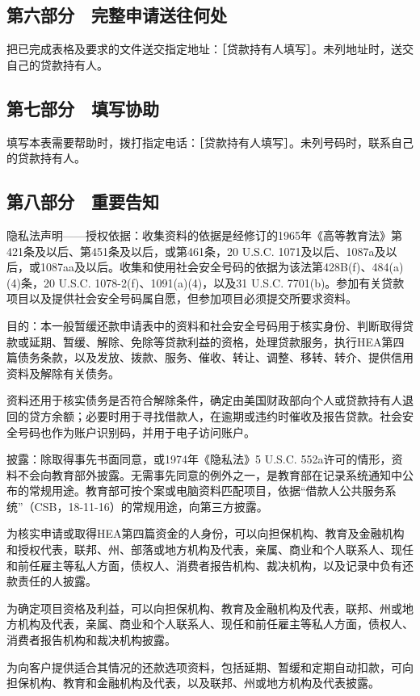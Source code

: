 \documentclass[UTF8,fontset=none,11pt,a4paper]{ctexart}
\begin{document}
\subsection*{第六部分　完整申请送往何处}
把已完成表格及要求的文件送交指定地址：［贷款持有人填写］。未列地址时，送交自己的贷款持有人。


\subsection*{第七部分　填写协助}
填写本表需要帮助时，拨打指定电话：［贷款持有人填写］。未列号码时，联系自己的贷款持有人。


\subsection*{第八部分　重要告知}
隐私法声明——授权依据：收集资料的依据是经修订的1965年《高等教育法》第421条及以后、第451条及以后，或第461条，20 U.S.C. 1071及以后、1087a及以后，或1087aa及以后。收集和使用社会安全号码的依据为该法第428B(f)、484(a)(4)条，20 U.S.C. 1078-2(f)、1091(a)(4)，以及31 U.S.C. 7701(b)。参加有关贷款项目以及提供社会安全号码属自愿，但参加项目必须提交所要求资料。


目的：本一般暂缓还款申请表中的资料和社会安全号码用于核实身份、判断取得贷款或延期、暂缓、解除、免除等贷款利益的资格，处理贷款服务，执行HEA第四篇债务条款，以及发放、拨款、服务、催收、转让、调整、移转、转介、提供信用资料及解除有关债务。


资料还用于核实债务是否符合解除条件，确定由美国财政部向个人或贷款持有人退回的贷方余额；必要时用于寻找借款人，在逾期或违约时催收及报告贷款。社会安全号码也作为账户识别码，并用于电子访问账户。


披露：除取得事先书面同意，或1974年《隐私法》5 U.S.C. 552a许可的情形，资料不会向教育部外披露。无需事先同意的例外之一，是教育部在记录系统通知中公布的常规用途。教育部可按个案或电脑资料匹配项目，依据“借款人公共服务系统”（CSB，18-11-16）的常规用途，向第三方披露。


为核实申请或取得HEA第四篇资金的人身份，可以向担保机构、教育及金融机构和授权代表，联邦、州、部落或地方机构及代表，亲属、商业和个人联系人、现任和前任雇主等私人方面，债权人、消费者报告机构、裁决机构，以及记录中负有还款责任的人披露。


为确定项目资格及利益，可以向担保机构、教育及金融机构及代表，联邦、州或地方机构及代表，亲属、商业和个人联系人、现任和前任雇主等私人方面，债权人、消费者报告机构和裁决机构披露。


为向客户提供适合其情况的还款选项资料，包括延期、暂缓和定期自动扣款，可向担保机构、教育和金融机构及代表，以及联邦、州或地方机构及代表披露。
\end{document}
